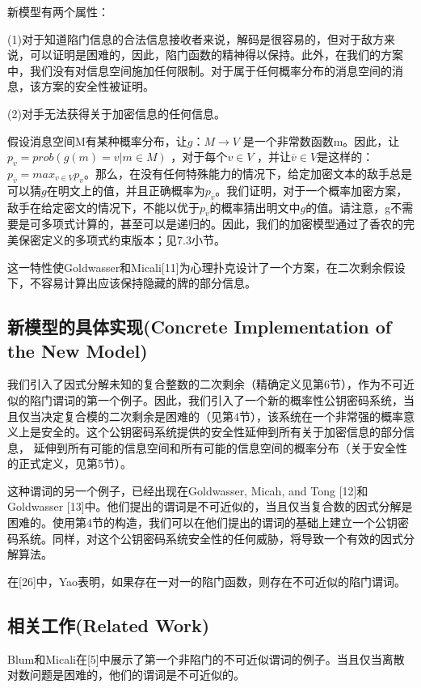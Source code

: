 \documentclass[]{article}
\begin{document}
新模型有两个属性：

(1)对于知道陷门信息的合法信息接收者来说，解码是很容易的，但对于敌方来说，可以证明是困难的，因此，陷门函数的精神得以保持。此外，在我们的方案中，我们没有对信息空间施加任何限制。对于属于任何概率分布的消息空间的消息，该方案的安全性被证明。

(2)对手无法获得关于加密信息的任何信息。


假设消息空间M有某种概率分布，让$g：M\rightarrow V$ 是一个非常数函数m。因此，让$p_v = prob \left( g\left( m\right)=v | m\in M\right)$ ，对于每个$v\in V$ ，并让$\overline{v}\in V$是这样的：$p_{\overline{v}}=max_{v\in V} p_v$。那么，在没有任何特殊能力的情况下，给定加密文本的敌手总是可以猜$g$在明文上的值，并且正确概率为$p_{\overline{v}}$。我们证明，对于一个概率加密方案，敌手在给定密文的情况下，不能以优于$p_{\overline{v}}$的概率猜出明文中$g$的值。请注意，g不需要是可多项式计算的，甚至可以是递归的。因此，我们的加密模型通过了香农的完美保密定义的多项式约束版本；见7.3小节。


这一特性使Goldwasser和Micali[11]为心理扑克设计了一个方案，在二次剩余假设下，不容易计算出应该保持隐藏的牌的部分信息。

\subsection{新模型的具体实现(Concrete Implementation of the New Model)}

我们引入了因式分解未知的复合整数的二次剩余（精确定义见第6节），作为不可近似的陷门谓词的第一个例子。因此，我们引入了一个新的概率性公钥密码系统，当且仅当决定复合模的二次剩余是困难的（见第4节），该系统在一个非常强的概率意义上是安全的。这个公钥密码系统提供的安全性延伸到所有关于加密信息的部分信息，
延伸到所有可能的信息空间和所有可能的信息空间的概率分布（关于安全性的正式定义，见第5节）。


这种谓词的另一个例子，已经出现在Goldwasser, Micah, and Tong [12]和Goldwasser [13]中。他们提出的谓词是不可近似的，当且仅当复合数的因式分解是困难的。使用第4节的构造，我们可以在他们提出的谓词的基础上建立一个公钥密码系统。同样，对这个公钥密码系统安全性的任何威胁，将导致一个有效的因式分解算法。


在[26]中，Yao表明，如果存在一对一的陷门函数，则存在不可近似的陷门谓词。

\subsection{相关工作(Related Work)}

Blum和Micali在[5]中展示了第一个非陷门的不可近似谓词的例子。当且仅当离散对数问题是困难的，他们的谓词是不可近似的。
\end{document}
